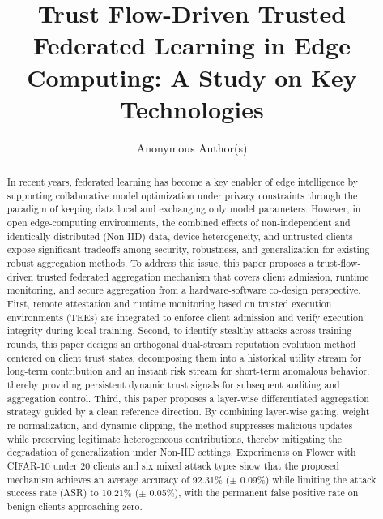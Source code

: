\documentclass[runningheads,orivec]{llncs}
\begin{document}
\title{Trust Flow-Driven Trusted Federated Learning in Edge Computing: A Study on Key Technologies}

\author{Anonymous Author(s)}
\institute{}

\maketitle

\begin{abstract}
    In recent years, federated learning has become a key enabler of edge
    intelligence by supporting collaborative model optimization under privacy
    constraints through the paradigm of keeping data local and exchanging only
    model parameters. However, in open edge-computing environments, the combined
    effects of non-independent and identically distributed (Non-IID) data,
    device heterogeneity, and untrusted clients expose significant tradeoffs
    among security, robustness, and generalization for existing robust
    aggregation methods. To address this issue, this paper proposes a trust-flow-driven
    trusted federated aggregation mechanism that covers client admission, runtime
    monitoring, and secure aggregation from a hardware-software co-design
    perspective. First, remote attestation and runtime monitoring based on
    trusted execution environments (TEEs) are integrated to enforce client
    admission and verify execution integrity during local training. Second, to
    identify stealthy attacks across training rounds, this paper designs an orthogonal
    dual-stream reputation evolution method centered on client trust states,
    decomposing them into a historical utility stream for long-term contribution
    and an instant risk stream for short-term anomalous behavior, thereby
    providing persistent dynamic trust signals for subsequent auditing and
    aggregation control. Third, this paper proposes a layer-wise
    differentiated aggregation strategy guided by a clean reference direction.
    By combining layer-wise gating, weight re-normalization, and dynamic
    clipping, the method suppresses malicious updates while preserving legitimate
    heterogeneous contributions, thereby mitigating the degradation of
    generalization under Non-IID settings. Experiments on Flower with CIFAR-10
    under 20 clients and six mixed attack types show that the proposed mechanism
    achieves an average accuracy of 92.31\% ($\pm$ 0.09\%) while limiting the
    attack success rate (ASR) to 10.21\% ($\pm$ 0.05\%), with the permanent false
    positive rate on benign clients approaching zero.
\end{abstract}
\end{document}
